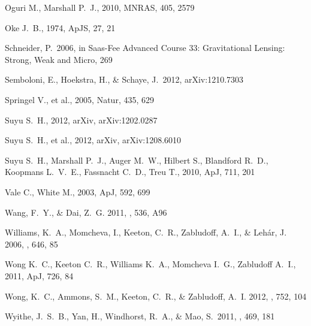 \begin{thebibliography}{99}
 Oguri M., Marshall P.~J., 2010, MNRAS, 405, 2579 


 Oke 
J.~B., 1974, ApJS, 27, 21 

 Schneider, P.\ 2006, 
in Saas-Fee Advanced Course 33: Gravitational Lensing: Strong, Weak and Micro, 
269 

 Semboloni, E., 
Hoekstra, H., \& Schaye, J.\ 2012, arXiv:1210.7303 


 Springel V., et al., 2005, Natur, 435, 629 


 Suyu 
S.~H., 2012, arXiv, arXiv:1202.0287 


Suyu S.~H., et al., 2012, arXiv, arXiv:1208.6010 


Suyu S.~H., Marshall P.~J., Auger M.~W., Hilbert S., Blandford R.~D., 
Koopmans L.~V.~E., Fassnacht C.~D., Treu T., 2010, ApJ, 711, 201 


 Vale C., White M., 2003, ApJ, 592, 699 


{Wang}, F.~Y., \& {Dai}, Z.~G. 2011, \aap, 536, A96


{Williams}, K.~A., {Momcheva}, I., {Keeton}, C.~R., {Zabludoff}, A.~I., \&
  {Leh{\'a}r}, J. 2006, \apj, 646, 85


Wong K.~C., Keeton C.~R., Williams K.~A., Momcheva I.~G., Zabludoff A.~I., 
2011, ApJ, 726, 84 


{Wong}, K.~C., {Ammons}, S.~M., {Keeton}, C.~R., \& {Zabludoff}, A.~I. 2012,
  \apj, 752, 104

 Wyithe, J.~S.~B., Yan, 
H., Windhorst, R.~A., \& Mao, S.\ 2011, \nat, 469, 181 



\end{thebibliography}
